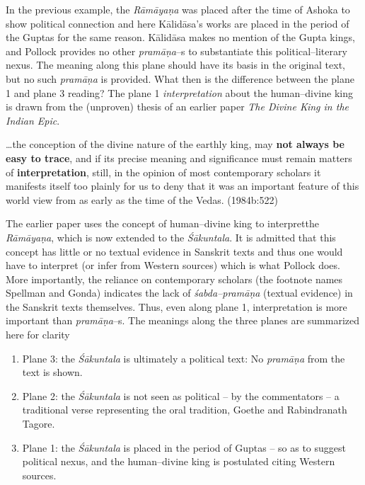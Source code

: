 In the previous example, the \textit{Rāmāyaṇa }was placed after the time of Ashoka to show political connection and here Kālidāsa’s works are placed in the period of the Guptas for the same reason. Kālidāsa makes no mention of the Gupta kings, and Pollock provides no other \textit{pramāṇa}–s to substantiate this political–literary nexus. The meaning along this plane should have its basis in the original text, but no such \textit{pramāṇa} is provided. What then is the difference between the plane 1 and plane 3 reading? The plane 1 \textit{interpretation} about the human–divine king is drawn from the (unproven) thesis of an earlier paper \textit{The Divine King in the Indian Epic}.

\begin{myquote}
…the conception of the divine nature of the earthly king, may \textbf{not always be easy to trace}, and if its precise meaning and significance must remain matters of \textbf{interpretation}, still, in the opinion of most contemporary scholars it manifests itself too plainly for us to deny that it was an important feature of this world view from as early as the time of the Vedas. (1984b:522)
\end{myquote}

The earlier paper uses the concept of human–divine king to interpretthe \textit{Rāmāyaṇa}, which is now extended to the \textit{Śākuntala}. It is admitted that this concept has little or no textual evidence in Sanskrit texts and thus one would have to interpret (or infer from Western sources) which is what Pollock does. More importantly, the reliance on contemporary scholars (the footnote names Spellman and Gonda) indicates the lack of \textit{śabda–pramāṇa }(textual evidence) in the Sanskrit texts themselves. Thus, even along plane 1, interpretation is more important than \textit{pramāṇa}–s. The meanings along the three planes are summarized here for clarity

\begin{enumerate}
\item Plane 3: the \textit{Śākuntala }is ultimately a political text: No \textit{pramāṇa} from the text is shown.

 \item Plane 2: the \textit{Śākuntala} is not seen as political – by the commentators – a traditional verse representing the oral tradition, Goethe and Rabindranath Tagore.

 \item Plane 1: the \textit{Śākuntala} is placed in the period of Guptas – so as to suggest political nexus, and the human–divine king is postulated citing Western sources.

\end{enumerate}


